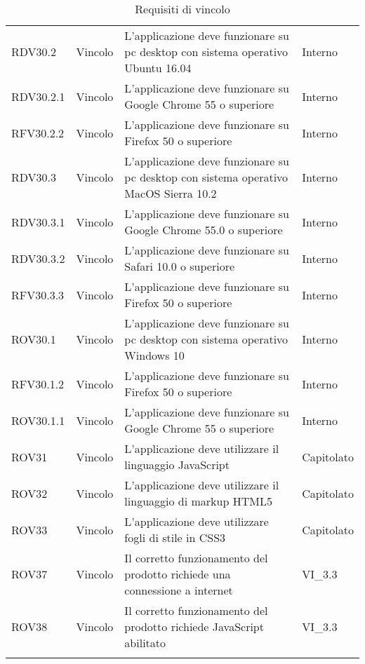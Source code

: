 \begin{longtable}{p{2cm}!{\VRule[1pt]}p{2cm}!{\VRule[1pt]}p{5cm}!{\VRule[1pt]}p{1.5cm}}
	RDV30.2&Vincolo\newline  & L'applicazione deve funzionare su pc desktop con sistema operativo Ubuntu 16.04 & Interno \\
	RDV30.2.1&Vincolo\newline  & L'applicazione deve funzionare su Google Chrome 55 o superiore & Interno \\
	RFV30.2.2&Vincolo\newline  & L'applicazione deve funzionare su Firefox 50 o superiore & Interno \\
	RDV30.3&Vincolo\newline  & L'applicazione deve funzionare su pc desktop con sistema operativo MacOS Sierra 10.2 & Interno \\
	RDV30.3.1&Vincolo\newline  & L'applicazione deve funzionare su Google Chrome 55.0 o superiore & Interno \\
	RDV30.3.2&Vincolo\newline  & L'applicazione deve funzionare su Safari 10.0 o superiore & Interno \\
	RFV30.3.3&Vincolo\newline  & L'applicazione deve funzionare su Firefox 50 o superiore & Interno \\
	ROV30.1&Vincolo\newline  & L'applicazione deve funzionare su pc desktop con sistema operativo Windows 10 & Interno \\
	RFV30.1.2&Vincolo\newline  & L'applicazione deve funzionare su Firefox 50 o superiore & Interno \\
	ROV30.1.1&Vincolo\newline  & L'applicazione deve funzionare su Google Chrome 55 o superiore & Interno \\
	ROV31&Vincolo\newline  & L'applicazione deve utilizzare il linguaggio JavaScript & Capitolato \\
	ROV32&Vincolo\newline  & L'applicazione deve utilizzare il linguaggio di markup HTML5 & Capitolato \\
	ROV33&Vincolo\newline  & L'applicazione deve utilizzare fogli di
	stile in CSS3 & Capitolato \\
	ROV37&Vincolo\newline  & Il corretto funzionamento del prodotto richiede una connessione a internet & VI_3.3 \\
	ROV38&Vincolo\newline  & Il corretto funzionamento del prodotto richiede JavaScript abilitato & VI_3.3 \\
	\caption{Requisiti di vincolo}
\end{longtable}

